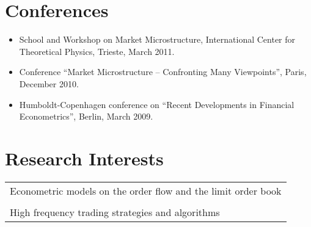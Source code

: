 \documentclass[a4paper,11pt]{article}
\begin{document}
\section*{Conferences}
\begin{itemize}
  \item School and Workshop on Market Microstructure, International Center for Theoretical Physics, Trieste, March 2011.
  \item Conference ``Market Microstructure -- Confronting Many Viewpoints'', Paris, December 2010.
  \item Humboldt-Copenhagen conference on ``Recent Developments in Financial Econometrics'', Berlin, March 2009.
\end{itemize}
\section*{Research Interests}
\noindent\hspace{20pt}
\begin{tabular}[h]{p{\textwidth}}
 Econometric models on the order flow and the limit order book\\
 \\
 High frequency trading strategies and algorithms\\
\end{tabular}
\end{document}
